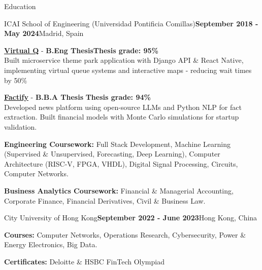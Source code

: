 \documentclass[
	11pt, %
]{resume} %
\begin{document}
\begin{rSection}{Education}

	\begin{rSubsection}{ICAI School of Engineering (Universidad Pontificia Comillas)}{\textbf{September 2018 - May 2024}}{\fontsize{12.5}{14.4}}{Madrid, Spain}
		\item {\href{https://github.com/yagoTobi/VirtualQ-Final-Version?tab=readme-ov-file}{\underline{\textbf{Virtual Q}}}} - \textbf{B.Eng Thesis}\hfill{\textbf{Thesis grade: 95\%}} \\
        Built microservice theme park application with Django API \& React Native, implementing virtual queue systems and interactive maps - reducing wait times by 50\%
               
        \item{\href{https://github.com/yagoTobi/Factify-Startup-Financial-Analysis/tree/main}{\underline{\textbf{Factify}}}} - \textbf{B.B.A Thesis} \hfill{\textbf{Thesis grade: 94\%}} \\
        Developed news platform using open-source LLMs and Python NLP for fact extraction. Built financial models with Monte Carlo simulations for startup validation.
		\item \textbf{Engineering Coursework:} Full Stack Development, Machine Learning (Supervised \& Unsupervised, Forecasting, Deep Learning), Computer Architecture (RISC-V, FPGA, VHDL), Digital Signal Processing, Circuits, Computer Networks.
        \item \textbf{Business Analytics Coursework:} Financial \& Managerial Accounting, Corporate Finance, Financial Derivatives, Civil \& Business Law. 

	\end{rSubsection}

        \begin{rSubsection}{City University of Hong Kong}{\textbf{September 2022 - June 2023}}{\fontsize{12}{14.4}\selectfont{Computer Engineering and Business Management - Exchange Program}}{Hong Kong, China}
        \item \textbf{Courses:} Computer Networks, Operations Research, Cybersecurity, Power \& Energy Electronics, Big Data. 
        \item \textbf{Certificates:} Deloitte \& HSBC FinTech Olympiad 
	\end{rSubsection}
			
\end{rSection}
\end{document}
